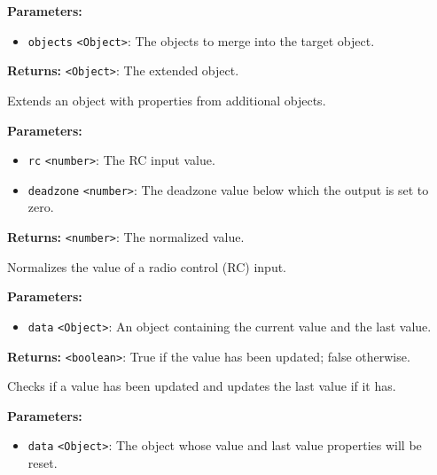 \documentclass[12pt,a4paper]{article}
\begin{document}
\noindent \textbf{Parameters:}
\begin{itemize}
  \item \texttt{objects} \texttt{<Object>}: The objects to merge into the target object.
\end{itemize}

\noindent \textbf{Returns:} \texttt{<Object>}: The extended object.

\noindent Extends an object with properties from additional objects.

\vspace{5mm}
\noindent {}


\noindent \textbf{Parameters:}
\begin{itemize}
  \item \texttt{rc} \texttt{<number>}: The RC input value.
  \item \texttt{deadzone} \texttt{<number>}: The deadzone value below which the output is set to zero.
\end{itemize}

\noindent \textbf{Returns:} \texttt{<number>}: The normalized value.

\noindent Normalizes the value of a radio control (RC) input.

\vspace{5mm}
\noindent {}


\noindent \textbf{Parameters:}
\begin{itemize}
  \item \texttt{data} \texttt{<Object>}: An object containing the current value and the last value.
\end{itemize}

\noindent \textbf{Returns:} \texttt{<boolean>}: True if the value has been updated; false otherwise.

\noindent Checks if a value has been updated and updates the last value if it has.

\vspace{5mm}
\noindent {}


\noindent \textbf{Parameters:}
\begin{itemize}
  \item \texttt{data} \texttt{<Object>}: The object whose value and last value properties will be reset.
\end{itemize}
\end{document}
